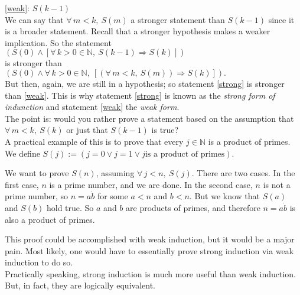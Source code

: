 \documentclass[12pt]{report}
\newcommand{\fall}{\forall\,}
\newcommand{\naturals}{\mathbb{N}}
\begin{document}
\ref{weak}: $S(k-1)$\\

We can say that $\fall m < k,\ S(m)$ a stronger statement than $S(k-1)$ since
it is a broader statement. Recall that a stronger hypothesis makes a weaker
implication. So the statement\\

$(S(0) \land [\fall k > 0 \in \naturals,\ S(k-1) \Rightarrow S(k)])$\\

is stronger than \\

$(S(0) \land \fall k > 0 \in \naturals,
\ [(\fall m < k,\ S(m)) \Rightarrow S(k)]).$
\\

But then, again, we are still in a hypothesis; so statement \ref{strong} is
stronger than \ref{weak}. This is why statement \ref{strong} is known as the
 {\em strong form of indunction} and statement
\ref{weak}  the {\em weak form}. \\

The point is: would you rather prove a statement based on the assumption that
$\fall m < k,\ S(k)$ or just that $S(k - 1)$ is true?\\

A practical example of this is to prove that every $j \in \naturals$ is a
product of primes. We define $S(j) := (j = 0 \lor j = 1 \lor j \textrm{is a
product of primes})$.

We want to prove $S(n)$, assuming $\fall j < n,\ S(j)$. There are two cases.
In the first case, $n$ is a prime number, and we are done. In the second case,
$n$ is not a prime number, so $n = a \dot b$ for some $a < n$ and $b < n$.
But we know that $S(a)$ and $S(b)$ hold true. So $a$ and $b$ are products of
primes, and therefore $n = a \dot b$ is also a product of primes.

This proof could be accomplished with weak induction, but it would be a major
pain. Most likely, one would have to essentially prove strong induction via
weak induction to do so.\\

Practically speaking, strong induction is much more useful than weak
induction. But, in fact, they are logically equivalent.
\end{document}
